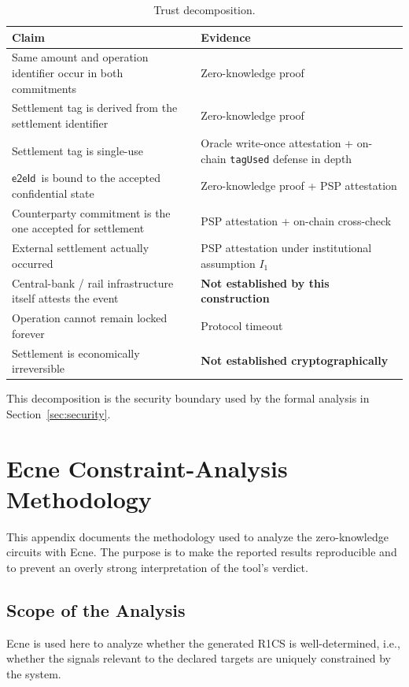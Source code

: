 \documentclass[10pt,twocolumn]{article}
\newcommand{\eeid}{\ensuremath{\mathsf{e2eId}}}
\newcommand{\code}[1]{\texttt{#1}}
\begin{document}
\begin{table}[t]
\centering
\scriptsize
\setlength{\tabcolsep}{3pt}
\begin{tabular}{@{}p{7.5cm}p{7.5cm}@{}}
\toprule
Claim & Evidence \\
\midrule
Same amount and operation identifier occur in both commitments & Zero-knowledge proof \\
Settlement tag is derived from the settlement identifier & Zero-knowledge proof \\
Settlement tag is single-use & Oracle write-once attestation + on-chain \code{tagUsed} defense in depth \\
\eeid\ is bound to the accepted confidential state & Zero-knowledge proof + PSP attestation \\
Counterparty commitment is the one accepted for settlement & PSP attestation + on-chain cross-check \\
External settlement actually occurred & PSP attestation under institutional assumption $I_1$ \\
Central-bank / rail infrastructure itself attests the event & \textbf{Not established by this construction} \\
Operation cannot remain locked forever & Protocol timeout \\
Settlement is economically irreversible & \textbf{Not established cryptographically} \\
\bottomrule
\end{tabular}
\caption{Trust decomposition.}
\end{table}

This decomposition is the security boundary used by the formal analysis
in Section~\ref{sec:security}.

\section{Ecne Constraint-Analysis Methodology}
\label{app:ecne}

This appendix documents the methodology used to analyze the
zero-knowledge circuits with Ecne. The purpose is to make the reported
results reproducible and to prevent an overly strong interpretation of
the tool's verdict.

\subsection{Scope of the Analysis}

Ecne is used here to analyze whether the generated R1CS is
well-determined, i.e., whether the signals relevant to the declared
targets are uniquely constrained by the system.
\end{document}
